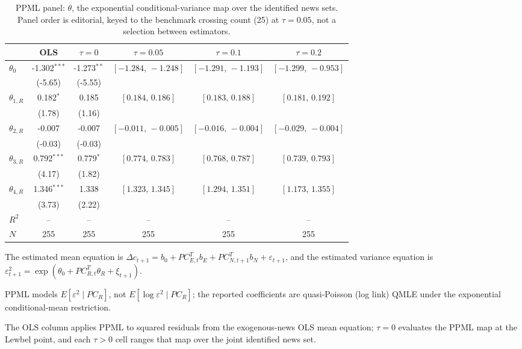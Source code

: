 \documentclass[11pt]{article}
\begin{document}
\begin{table}[!htbp]
\centering
\begin{threeparttable}
\caption{PPML panel: $\theta$, the exponential conditional-variance map over the identified news sets. Panel order is editorial, keyed to the benchmark crossing count (25) at $\tau{=}0.05$, not a selection between estimators.}
\label{tab:log_var_eq_panel_ppml}
\footnotesize\setlength{\tabcolsep}{3pt}
\begin{tabular}{lccccc}
\toprule
 & OLS & $\tau{=}0$ & $\tau{=}0.05$ & $\tau{=}0.1$ & $\tau{=}0.2$ \\
\midrule
$\theta_0$ & -1.302$^{***}$ & -1.273$^{**}$ & $[-1.284,\,-1.248]$ & $[-1.291,\,-1.193]$ & $[-1.299,\,-0.953]$ \\
 & (-5.65) & (-5.55) &  &  &  \\
\midrule
$\theta_{1,R}$ & 0.182$^{*}$ & 0.185 & $[0.184,\,0.186]$ & $[0.183,\,0.188]$ & $[0.181,\,0.192]$ \\
 & (1.78) & (1.16) &  &  &  \\
$\theta_{2,R}$ & -0.007 & -0.007 & $[-0.011,\,-0.005]$ & $[-0.016,\,-0.004]$ & $[-0.029,\,-0.004]$ \\
 & (-0.03) & (-0.03) &  &  &  \\
$\theta_{3,R}$ & 0.792$^{***}$ & 0.779$^{*}$ & $[0.774,\,0.783]$ & $[0.768,\,0.787]$ & $[0.739,\,0.793]$ \\
 & (4.17) & (1.82) &  &  &  \\
$\theta_{4,R}$ & 1.346$^{***}$ & 1.338 & $[1.323,\,1.345]$ & $[1.294,\,1.351]$ & $[1.173,\,1.355]$ \\
 & (3.73) & (2.22) &  &  &  \\
$R^2$ & -- & -- & -- & -- & -- \\
$N$ & 255 & 255 & 255 & 255 & 255 \\
\bottomrule
\end{tabular}
\begin{tablenotes}[flushleft]
\scriptsize
\item The estimated mean equation is $\Delta c_{t+1}=b_{0}+PC_{E,t}^{T}b_{E}+ PC_{N,t+1}^{T}b_{N}+\varepsilon_{t+1}$, and the estimated variance equation is $\varepsilon_{t+1}^{2}= \exp(\theta_{0}+PC_{R,t}^{T}\theta_{R}+\xi_{t+1})$.
\item PPML models $E[\varepsilon^2 \mid PC_R]$, not $E[\log \varepsilon^2 \mid PC_R]$; the reported coefficients are quasi-Poisson (log link) QMLE under the exponential conditional-mean restriction.
\item The OLS column applies PPML to squared residuals from the exogenous-news OLS mean equation; $\tau{=}0$ evaluates the PPML map at the Lewbel point, and each $\tau{>}0$ cell ranges that map over the joint identified news set.

\end{tablenotes}
\end{threeparttable}
\end{table}
\end{document}
